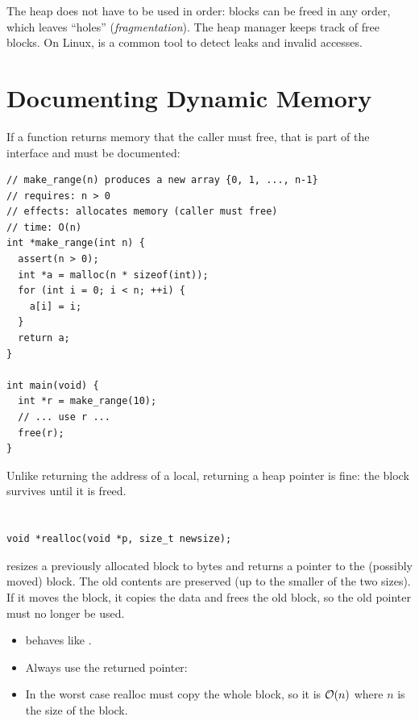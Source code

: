 \begin{aside}
The heap does not have to be used in order: blocks can be freed in any order, which leaves
``holes'' (\emph{fragmentation}). The heap manager keeps track of free blocks. On Linux,
 is a common tool to detect leaks and invalid accesses.
\end{aside}

\section{Documenting Dynamic Memory}

If a function returns memory that the caller must free, that is part of the interface and must be
documented:
\begin{lstlisting}[style=c]
// make_range(n) produces a new array {0, 1, ..., n-1}
// requires: n > 0
// effects: allocates memory (caller must free)
// time: O(n)
int *make_range(int n) {
  assert(n > 0);
  int *a = malloc(n * sizeof(int));
  for (int i = 0; i < n; ++i) {
    a[i] = i;
  }
  return a;
}

int main(void) {
  int *r = make_range(10);
  // ... use r ...
  free(r);
}
\end{lstlisting}
Unlike returning the address of a local, returning a heap pointer is fine: the block survives
until it is freed.

\section{}

\begin{lstlisting}[style=c]
void *realloc(void *p, size_t newsize);
\end{lstlisting}
 resizes a previously allocated block to  bytes and returns a pointer
to the (possibly moved) block. The old contents are preserved (up to the smaller of the two
sizes). If it moves the block, it copies the data and frees the old block, so the old pointer
must no longer be used.
\begin{itemize}
  \item {} behaves like .
  \item Always use the returned pointer: 
  \item In the worst case realloc must copy the whole block, so it is $\mathcal{O}(n)$ where $n$ is the
    size of the block.
\end{itemize}

